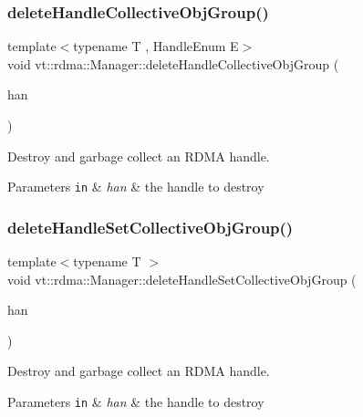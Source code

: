 \subsubsection{\texorpdfstring{delete\+Handle\+Collective\+Obj\+Group()}{deleteHandleCollectiveObjGroup()}}
{\footnotesize\ttfamily template$<$typename T , Handle\+Enum E$>$ \\
void vt\+::rdma\+::\+Manager\+::delete\+Handle\+Collective\+Obj\+Group (\begin{DoxyParamCaption}\item[{\hyperlink{structvt_1_1rdma_1_1_handle}{Handle}$<$ T, E $>$ const \&}]{han }\end{DoxyParamCaption})}



Destroy and garbage collect an R\+D\+MA handle. 


\begin{DoxyParams}[1]{Parameters}
\mbox{\tt in}  & {\em han} & the handle to destroy \\
\hline
\end{DoxyParams}
\mbox{\label{structvt_1_1rdma_1_1_manager_a9b3b9bf148a8225295879481345e4af3}} 
\subsubsection{\texorpdfstring{delete\+Handle\+Set\+Collective\+Obj\+Group()}{deleteHandleSetCollectiveObjGroup()}}
{\footnotesize\ttfamily template$<$typename T $>$ \\
void vt\+::rdma\+::\+Manager\+::delete\+Handle\+Set\+Collective\+Obj\+Group (\begin{DoxyParamCaption}\item[{\hyperlink{structvt_1_1rdma_1_1_handle_set}{Handle\+Set}$<$ T $>$ \&}]{han }\end{DoxyParamCaption})}



Destroy and garbage collect an R\+D\+MA handle. 


\begin{DoxyParams}[1]{Parameters}
\mbox{\tt in}  & {\em han} & the handle to destroy \\
\hline
\end{DoxyParams}
\mbox{\label{structvt_1_1rdma_1_1_manager_ad4ff20cf1ba6e870326b20900e6eb581}} 
